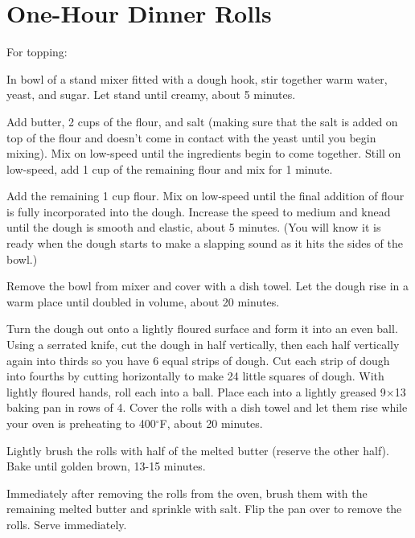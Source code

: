 \section{One-Hour Dinner Rolls}
\begin{recipe}
	
	
	
	
	For topping:
	
	
	
	In bowl of a stand mixer fitted with a dough hook, stir together warm water, yeast, and sugar. Let stand until creamy, about 5 minutes.
	
	Add butter, 2 cups of the flour, and salt (making sure that the salt is added on top of the flour and doesn't come in contact with the yeast until you begin mixing). Mix on low-speed until the ingredients begin to come together. Still on low-speed, add 1 cup of the remaining flour and mix for 1 minute.
	
	Add the remaining 1 cup flour. Mix on low-speed until the final addition of flour is fully incorporated into the dough. Increase the speed to medium and knead until the dough is smooth and elastic, about 5 minutes. (You will know it is ready when the dough starts to make a slapping sound as it hits the sides of the bowl.)
	
	Remove the bowl from mixer and cover with a dish towel. Let the dough rise in a warm place until doubled in volume, about 20 minutes.
	
	Turn the dough out onto a lightly floured surface and form it into an even ball. Using a serrated knife, cut the dough in half vertically, then each half vertically again into thirds so you have 6 equal strips of dough. Cut each strip of dough into fourths by cutting horizontally to make 24 little squares of dough. With lightly floured hands, roll each into a ball. Place each into a lightly greased 9×13 baking pan in rows of 4.	Cover the rolls with a dish towel and let them rise while your oven is preheating to 400$^{\circ}$F, about 20 minutes.
	
	Lightly brush the rolls with half of the melted butter (reserve the other half). Bake until golden brown, 13-15 minutes.
	
	Immediately after removing the rolls from the oven, brush them with the remaining melted butter and sprinkle with salt. Flip the pan over to remove the rolls. Serve immediately.
	
	
	
	
\end{recipe}
